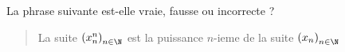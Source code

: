 La phrase suivante est-elle vraie, fausse ou incorrecte ?
\begin{quote}
 La suite $\left(x_n ^n \right)_{n\in\N}$ est la puissance $n$-ieme de la suite $\left(x_n \right)_{n\in\N}$
\end{quote}
